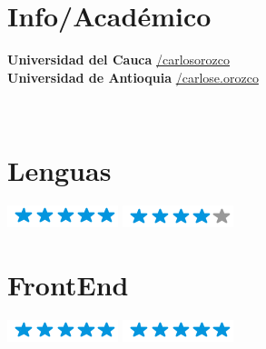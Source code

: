 \documentclass[]{cv-class}
\begin{document}
\begin{aside}
	\section{Info/Académico}
	\textbf{Universidad del Cauca} \href{mailto:carlosorozco@unicauca.edu.co}{/carlosorozco} \\
	\textbf{Universidad de Antioquia}
	\href{mailto:carlose.orozco@udea.edu.co}{/carlose.orozco}

	~
	\section{Lenguas}
	{\includegraphics[scale=0.40]{img/5stars.png}}
	{\includegraphics[scale=0.40]{img/4stars.png}}
	~

	\section{FrontEnd}
	{\includegraphics[scale=0.40]{img/5stars.png}}
	{\includegraphics[scale=0.40]{img/5stars.png}}
	~


\end{aside}
\end{document}
